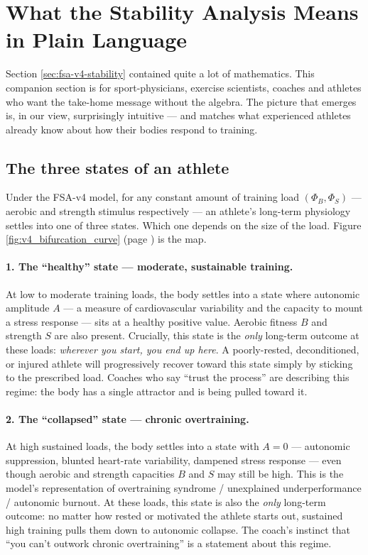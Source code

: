 \section{What the Stability Analysis Means in Plain Language} \label{sec:fsa-v4-intuition}

Section \ref{sec:fsa-v4-stability} contained quite a lot of mathematics. This companion section is for sport-physicians, exercise scientists, coaches and athletes who want the take-home message without the algebra. The picture that emerges is, in our view, surprisingly intuitive — and matches what experienced athletes already know about how their bodies respond to training.

\subsection{The three states of an athlete}

Under the FSA-v4 model, for any constant amount of training load $(\Phi_B, \Phi_S)$ — aerobic and strength stimulus respectively — an athlete's long-term physiology settles into one of three states. Which one depends on the size of the load. Figure \ref{fig:v4_bifurcation_curve} (page \pageref{fig:v4_bifurcation_curve}) is the map.

\paragraph{1. The ``healthy'' state — moderate, sustainable training.}
At low to moderate training loads, the body settles into a state where autonomic amplitude $A$ — a measure of cardiovascular variability and the capacity to mount a stress response — sits at a healthy positive value. Aerobic fitness $B$ and strength $S$ are also present. Crucially, this state is the \emph{only} long-term outcome at these loads: \emph{wherever you start, you end up here}. A poorly-rested, deconditioned, or injured athlete will progressively recover toward this state simply by sticking to the prescribed load. Coaches who say ``trust the process'' are describing this regime: the body has a single attractor and is being pulled toward it.

\paragraph{2. The ``collapsed'' state — chronic overtraining.}
At high sustained loads, the body settles into a state with $A = 0$ — autonomic suppression, blunted heart-rate variability, dampened stress response — even though aerobic and strength capacities $B$ and $S$ may still be high. This is the model's representation of overtraining syndrome / unexplained underperformance / autonomic burnout. At these loads, this state is also the \emph{only} long-term outcome: no matter how rested or motivated the athlete starts out, sustained high training pulls them down to autonomic collapse. The coach's instinct that ``you can't outwork chronic overtraining'' is a statement about this regime.

